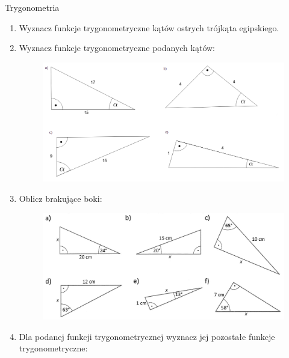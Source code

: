 \documentclass[12pt,a4paper]{article}
\begin{document}
	\begin{center}
		\LARGE Trygonometria
	\end{center}
	\vspace{1cm}
	
	
	\begin{enumerate}[1.]
		\item Wyznacz funkcje trygonometryczne kątów ostrych trójkąta egipskiego.
		
		\item Wyznacz funkcje trygonometryczne podanych kątów:
		
		\begin{figure}[h]
			\includegraphics[scale=0.35]{t1}
		\end{figure}
	
		\item Oblicz brakujące boki:
		
		\begin{figure}[h]
			\includegraphics[scale=0.65]{t2}
		\end{figure}
	
			\item Dla podanej funkcji trygonometrycznej wyznacz jej pozostałe funkcje trygonometryczne:
	

\end{enumerate}
\end{document}
